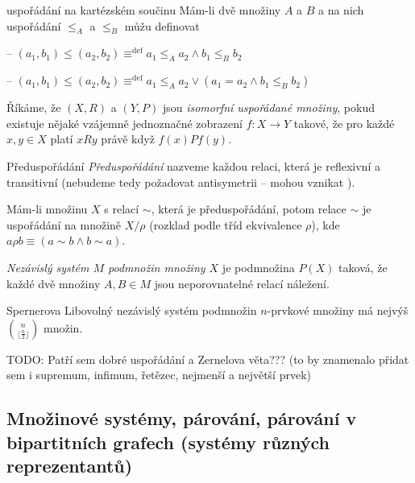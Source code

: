 \begin{poznamkaN}{uspořádání na kartézském součinu}
Mám-li dvě množiny $A$ a $B$ a na nich uspořádání $\leq_A$ a $\leq_B$ můžu definovat 
\begin{pitemize}
    \item {} -- $(a_1,b_1)\leq(a_2,b_2)\equiv^{\textrm{def}} a_1\leq_A a_2 \wedge b_1 \leq_B b_2$
    \item {} -- $(a_1,b_1)\leq(a_2,b_2)\equiv^{\textrm{def}} a_1\leq_A a_2 \vee ( a_1=a_2 \wedge b_1\leq_B b_2)$
\end{pitemize}
\end{poznamkaN}

\begin{definice}
Říkáme, že $(X,R)$ a $(Y,P)$ jsou \emph{isomorfní uspořádané množiny}, pokud existuje nějaké vzájemně jednoznačné zobrazení $f:X \rightarrow Y$ takové, že pro každé $x,y \in X$ platí $xRy$ právě když $f(x) P f(y)$.
\end{definice}

\begin{definiceN}{Předuspořádání}
\emph{Předuspořádání} nazveme každou relaci, která je reflexivní a transitivní (nebudeme tedy požadovat antisymetrii -- mohou vznikat ).
\end{definiceN}

\begin{poznamka}
Mám-li množinu $X$ s relací $\sim$, která je předuspořádání, potom relace $\sim$ je uspořádání na množině $X/\rho$ (rozklad podle tříd ekvivalence $\rho$), kde $a\rho b\equiv (a\sim b \wedge b\sim a)$.
\end{poznamka}

\begin{definice}
\emph{Nezávislý systém $M$ podmnožin množiny $X$} je podmnožina $P(X)$ taková, že každé dvě množiny $A, B \in M$ jsou neporovnatelné relací náležení.
\end{definice}

\begin{vetaN}{Spernerova}
Libovolný nezávislý systém podmnožin $n$-prvkové množiny má nejvýš $\binom{n}{\lfloor\frac{n}{2}\rfloor}$ množin.
\end{vetaN}

TODO: Patří sem dobré uspořádání a Zernelova věta??? (to by znamenalo přidat sem i supremum, infimum, řetězec, nejmenší a největší prvek)

\subsection{Množinové systémy, párování, párování v bipartitních grafech (systémy různých reprezentantů)}

